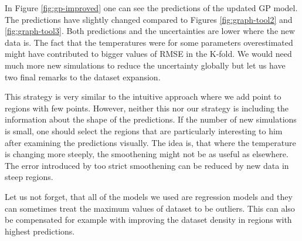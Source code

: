 In Figure \ref{fig:gp-improved} one can see the predictions of the updated GP model. The predictions have slightly changed compared to Figures \ref{fig:graph-tool2} and \ref{fig:graph-tool3}. Both predictions and the uncertainties are lower where the new data is. The fact that the temperatures were for some parameters overestimated might have contributed to bigger values of RMSE in the K-fold. We would need much more new simulations to reduce the uncertainty globally but let us have two final remarks to the dataset expansion.

This strategy is very similar to the intuitive approach where we add point to regions with few points. However, neither this nor our strategy is including the information about the shape of the predictions. If the number of new simulations is small, one should select the regions that are particularly interesting to him after examining the predictions visually. The idea is, that where the temperature is changing more steeply, the smoothening might not be as useful as elsewhere. The error introduced by too strict smoothening can be reduced by new data in steep regions.

Let us not forget, that all of the models we used are regression models and they can sometimes treat the maximum values of dataset to be outliers. This can also be compensated for example with improving the dataset density in regions with highest predictions.